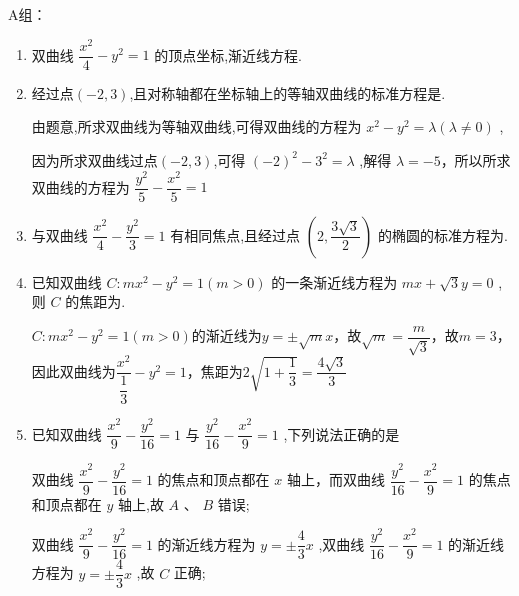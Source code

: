 A组：
\begin{enumerate}
    \item 双曲线 $\dfrac{{x}^{2}}{4} - {y}^{2} = 1$ 的顶点坐标,渐近线方程.
    
    \item 经过点$(-2,3)$,且对称轴都在坐标轴上的等轴双曲线的标准方程是.
    \begin{jieda}
        由题意,所求双曲线为等轴双曲线,可得双曲线的方程为 ${x}^{2} - {y}^{2} = \lambda \left( {\lambda  \neq  0}\right)$ ,
        
        因为所求双曲线过点$(-2,3)$,可得 ${\left( -2\right) }^{2} - {3}^{2} = \lambda$ ,解得 $\lambda  =  - 5$，所以所求双曲线的方程为 $\dfrac{{y}^{2}}{5} - \dfrac{{x}^{2}}{5} = 1$ 
    \end{jieda}
    
    \item 与双曲线 $\dfrac{{x}^{2}}{4} - \dfrac{{y}^{2}}{3} = 1$ 有相同焦点,且经过点 $\left( {2,\dfrac{3\sqrt{3}}{2}}\right)$ 的椭圆的标准方程为.

    \item 已知双曲线 $C : m{x}^{2} - {y}^{2} = 1\left( {m > 0}\right)$ 的一条渐近线方程为 ${mx} + \sqrt{3}y = 0$ ,则 $C$ 的焦距为.
    \begin{jieda}
        $C : m{x}^{2} - {y}^{2} = 1\left( {m > 0}\right)$的渐近线为$y = \pm \sqrt{m}x$，故$\sqrt{m} = \dfrac{m}{\sqrt{3}}$，故$m = 3$，因此双曲线为$\dfrac{x^2}{\dfrac{1}{3}} - {y}^{2} = 1$，焦距为$2\sqrt{1+\dfrac{1}{3}} = \dfrac{4\sqrt{3}}{3}$
    \end{jieda}

    \item 已知双曲线 $\dfrac{{x}^{2}}{9} - \dfrac{{y}^{2}}{16} = 1$ 与 $\dfrac{{y}^{2}}{16} - \dfrac{{x}^{2}}{9} = 1$ ,下列说法正确的是
    \begin{jieda}
        双曲线 $\dfrac{{x}^{2}}{9} - \dfrac{{y}^{2}}{16} = 1$ 的焦点和顶点都在 $x$ 轴上，而双曲线 $\dfrac{{y}^{2}}{16} - \dfrac{{x}^{2}}{9} = 1$ 的焦点和顶点都在 $y$ 轴上,故 ${A}$ 、 ${B}$ 错误;
        
        双曲线 $\dfrac{{x}^{2}}{9} - \dfrac{{y}^{2}}{16} = 1$ 的渐近线方程为 $y =  \pm  \dfrac{4}{3}x$ ,双曲线 $\dfrac{{y}^{2}}{16} - \dfrac{{x}^{2}}{9} = 1$ 的渐近线方程为 $y =  \pm  \dfrac{4}{3}x$ ,故 ${C}$ 正确;
        

\end{jieda}
\end{enumerate}
